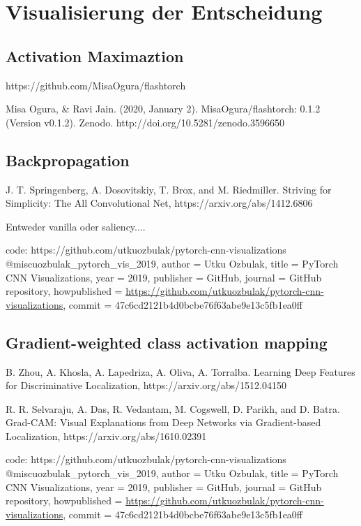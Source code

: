 \section{Visualisierung der Entscheidung} \label{sec:visAlgos}

\subsection{Activation Maximaztion} \label{sec:actMax}
https://github.com/MisaOgura/flashtorch


Misa Ogura, & Ravi Jain. (2020, January 2).
MisaOgura/flashtorch: 0.1.2 (Version v0.1.2).
Zenodo. http://doi.org/10.5281/zenodo.3596650


\subsection{Backpropagation} \label{sec:backprop}
J. T. Springenberg, A. Dosovitskiy, T. Brox, and M. Riedmiller. Striving for Simplicity: The All Convolutional Net, https://arxiv.org/abs/1412.6806

Entweder vanilla oder saliency....

code: https://github.com/utkuozbulak/pytorch-cnn-visualizations
@misc{uozbulak_pytorch_vis_2019,
  author = {Utku Ozbulak},
  title = {PyTorch CNN Visualizations},
  year = {2019},
  publisher = {GitHub},
  journal = {GitHub repository},
  howpublished = {\url{https://github.com/utkuozbulak/pytorch-cnn-visualizations}},
  commit = {47c6cd2121b4d0bcbe76f63abe9e13c5fb1ea0ff}
}

\subsection{Gradient-weighted class activation mapping}
B. Zhou, A. Khosla, A. Lapedriza, A. Oliva, A. Torralba. Learning Deep Features for Discriminative Localization, https://arxiv.org/abs/1512.04150

R. R. Selvaraju, A. Das, R. Vedantam, M. Cogswell, D. Parikh, and D. Batra. Grad-CAM: Visual Explanations from Deep Networks via Gradient-based Localization, https://arxiv.org/abs/1610.02391

code: https://github.com/utkuozbulak/pytorch-cnn-visualizations
@misc{uozbulak_pytorch_vis_2019,
  author = {Utku Ozbulak},
  title = {PyTorch CNN Visualizations},
  year = {2019},
  publisher = {GitHub},
  journal = {GitHub repository},
  howpublished = {\url{https://github.com/utkuozbulak/pytorch-cnn-visualizations}},
  commit = {47c6cd2121b4d0bcbe76f63abe9e13c5fb1ea0ff}
}